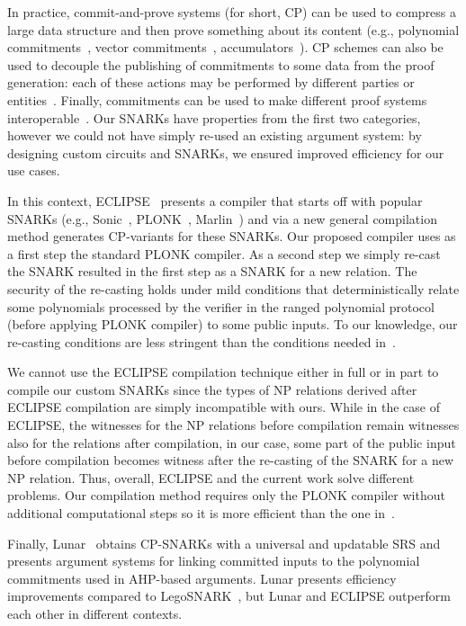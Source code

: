 In practice, commit-and-prove systems (for short, CP) can be used to compress a large data structure and then prove something about its
content (e.g., polynomial commitments~\cite{KZG_10}, vector commitments~\cite{vector_commitment_1}, accumulators~\cite{first_accumulator}).
CP schemes can also be used to decouple the publishing of commitments to some data from the proof generation: each of these actions may be
performed by different parties or entities~\cite{zkp_reference}. Finally, commitments can be used to make different proof systems
interoperable~\cite{CP_paper,interoperability_2}. Our SNARKs have properties from the first two categories, however we could not
have simply re-used an existing argument system: by designing custom circuits and SNARKs, we ensured improved efficiency for our use cases.

In this context, ECLIPSE~\cite{eclipse} presents a compiler that starts off with popular SNARKs (e.g., Sonic~\cite{sonic}, PLONK~\cite{plonk},
Marlin~\cite{marlin}) and via a new general compilation method generates CP-variants for these SNARKs.
Our proposed compiler uses as a first step the standard PLONK compiler.  As a second step we simply
re-cast the SNARK resulted in the first step as a SNARK for a new relation.
The security of the re-casting holds under mild conditions that deterministically relate some polynomials
processed by the verifier in the ranged polynomial protocol (before applying PLONK compiler) to some
public inputs. To our knowledge, our re-casting conditions are less stringent than the conditions needed
in~\cite{eclipse}.

We cannot use the ECLIPSE compilation technique either in full or in part to compile our custom SNARKs
since the types of NP relations derived after ECLIPSE compilation are simply incompatible with ours. While in the
case of ECLIPSE, the witnesses for the NP relations before compilation remain witnesses also for the relations
after compilation, in our case, some part of the public input before compilation becomes witness after the
re-casting of the SNARK for a new NP relation. Thus, overall, ECLIPSE and the current work solve different problems.
Our compilation method requires only the PLONK compiler without additional computational
steps so it is more efficient than the one in~\cite{eclipse}.

Finally, Lunar~\cite{lunar} obtains CP-SNARKs with a universal and updatable SRS and presents argument systems for
linking committed inputs to the polynomial commitments used in AHP-based arguments. Lunar presents efficiency improvements compared
to LegoSNARK~\cite{CP_paper}, but Lunar and ECLIPSE outperform each other in different contexts.


